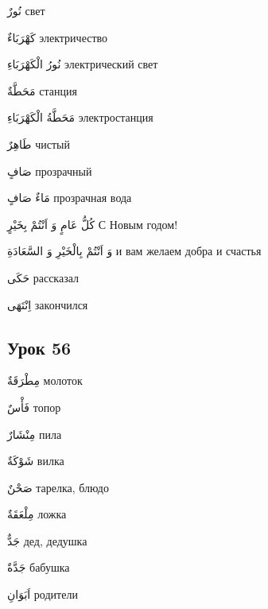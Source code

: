 \documentclass[a5paper]{article}
\newcommand\textstyleDropCaps[1]{#1}
\newcommand\textstyleCaptioncharacters[1]{#1}
\begin{document}
\textstyleCaptioncharacters{نُورٌ }\textstyleDropCaps{свет‎}

\textstyleCaptioncharacters{كَهْرَبَاءٌ }\textstyleDropCaps{электричество‎}

\textstyleCaptioncharacters{نُورُ الْكَهْرَبَاءِ }\textstyleDropCaps{электриче­ский свет‎}

\textstyleCaptioncharacters{مَحَطَّةٌ }\textstyleDropCaps{станция‎}

\textstyleCaptioncharacters{مَحَطَّةُ الْكَهْرَبَاءِ }\textstyleDropCaps{элек­тростанция‎}

\textstyleCaptioncharacters{طَاهِرٌ }\textstyleDropCaps{чистый‎}

\textstyleCaptioncharacters{صَافٍ }\textstyleDropCaps{прозрачный‎}

\textstyleCaptioncharacters{مَاءٌ صَافٍ }\textstyleDropCaps{прозрачная вода‎}

\textstyleCaptioncharacters{كُلُّ عَامٍ وَ اَنْتُمْ بِخَيْرٍ }\textstyleDropCaps{С Новым годом!‎}

\textstyleCaptioncharacters{وَ اَنْتُمْ بِالْخَيْرِ وَ السَّعَادَةِ }\textstyleDropCaps{и вам желаем добра и счастья‎}

\textstyleCaptioncharacters{حَكَى }\textstyleDropCaps{рассказал‎}

\textstyleCaptioncharacters{اِنْتَهَى }\textstyleDropCaps{закончился ‎}

\subsection[Урок 56‎]{\textstyleDropCaps{Урок 56‎}}
\textstyleCaptioncharacters{مِطْرَقَةٌ }\textstyleDropCaps{молоток‎}

\textstyleCaptioncharacters{فَأْسٌ }\textstyleDropCaps{топор‎}

\textstyleCaptioncharacters{مِنْشَارٌ }\textstyleDropCaps{пила‎}

\textstyleCaptioncharacters{شَوْكَةٌ }\textstyleDropCaps{вилка‎}

\textstyleCaptioncharacters{صَحْنٌ }\textstyleDropCaps{тарелка, блюдо‎}

\textstyleCaptioncharacters{مِلْعَقَةٌ }\textstyleDropCaps{ложка‎}

\textstyleCaptioncharacters{جَدٌّ }\textstyleDropCaps{дед, дедушка‎}

\textstyleCaptioncharacters{جَدَّةٌ }\textstyleDropCaps{бабушка‎}

\textstyleCaptioncharacters{اَبَوَانِ }\textstyleDropCaps{родители‎}
\end{document}
